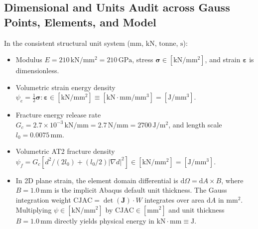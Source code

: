 \subsection{Dimensional and Units Audit across Gauss Points, Elements, and Model}
In the consistent structural unit system ($\text{mm}$, $\text{kN}$, $\text{tonne}$, $\text{s}$):
\begin{itemize}
  \item Modulus $E = 210\,\mathrm{kN/mm^2} = 210\,\mathrm{GPa}$, stress $\boldsymbol{\sigma} \in [\mathrm{kN/mm^2}]$, and strain $\boldsymbol{\varepsilon}$ is dimensionless.
  \item Volumetric strain energy density $\psi_e = \frac{1}{2}\boldsymbol{\sigma}:\boldsymbol{\varepsilon} \in [\mathrm{kN/mm^2}] \equiv [\mathrm{kN\cdot mm / mm^3}] = [\mathrm{J/mm^3}]$.
  \item Fracture energy release rate $G_c = 2.7\times 10^{-3}\,\mathrm{kN/mm} = 2.7\,\mathrm{N/mm} = 2700\,\mathrm{J/m^2}$, and length scale $l_0 = 0.0075\,\mathrm{mm}$.
  \item Volumetric AT2 fracture density $\psi_f = G_c [ d^2/(2l_0) + (l_0/2)|\nabla d|^2 ] \in [\mathrm{kN/mm^2}] = [\mathrm{J/mm^3}]$.
  \item In 2D plane strain, the element domain differential is $\mathrm{d}\Omega = \mathrm{d}A \times B$, where $B = 1.0\,\mathrm{mm}$ is the implicit Abaqus default unit thickness. The Gauss integration weight $\mathrm{CJAC} = \det(\mathbf{J})\cdot W$ integrates over area $\mathrm{d}A$ in $\mathrm{mm^2}$. Multiplying $\psi \in [\mathrm{kN/mm^2}]$ by $\mathrm{CJAC} \in [\mathrm{mm^2}]$ and unit thickness $B = 1.0\,\mathrm{mm}$ directly yields physical energy in $\mathrm{kN\cdot mm} \equiv \mathrm{J}$.
\end{itemize}

